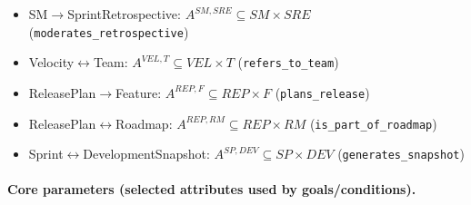 \documentclass[11pt,a4paper]{article}
\begin{document}
\begin{itemize}[leftmargin=2em]
  \item SM$\to$SprintRetrospective: $A^{SM,SRE}\subseteq SM\times SRE$ (\texttt{moderates\_retrospective})
  \item Velocity$\leftrightarrow$Team: $A^{VEL,T}\subseteq VEL\times T$ (\texttt{refers\_to\_team})
  \item ReleasePlan$\to$Feature: $A^{REP,F}\subseteq REP\times F$ (\texttt{plans\_release})
  \item ReleasePlan$\leftrightarrow$Roadmap: $A^{REP,RM}\subseteq REP\times RM$ (\texttt{is\_part\_of\_roadmap})
  \item Sprint$\leftrightarrow$DevelopmentSnapshot: $A^{SP,DEV}\subseteq SP\times DEV$ (\texttt{generates\_snapshot})
\end{itemize}

\paragraph{Core parameters (selected attributes used by goals/conditions).}
\end{document}
